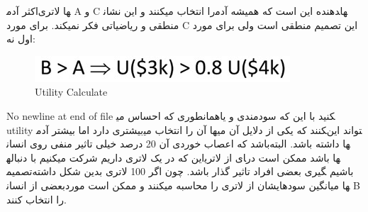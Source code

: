 اکثر آدم‎ها لاتری A و  C را انتخاب میکنند و این نشان‎دهنده این است که همیشه آدم‎ها منطقی و ریاضیاتی فکر نمیکند. برای مورد C این تصمیم منطقی است ولی برای مورد اول نه:

\begin{figure}[h!]
    \centering
    \includegraphics[width=0.6\linewidth]{images/lottery02.jpg}
    \caption{Utility Calculate}
\end{figure}

\author{
    استاد درس:
    \Instructor \\[25pt]
}
\date{\Semester}
No newline at end of file
همانطوری که احساس می‎کنید با این که سودمندی و یا utility بیشتری دارد اما بیشتر آدم‎ها آن را انتخاب می‎کنند که یکی از دلایل آن می‎تواند این باشد که اعصاب خوردی آن 20 درصد خیلی تاثیر منفی روی انسان‎ها داشته باشد. البته این که در یک لاتری داریم شرکت میکنیم با دنباله‎ای از لاتری‎ها باشد ممکن است در تصمیم‎گیری بعضی افراد تاثیر گذار باشد. چون اگر 100 لاتری بدین شکل داشته‎ باشیم بعضی از انسان‎ها میانگین سودهایشان از لاتری را محاسبه میکنند و ممکن است مورد B را انتخاب کنند.
